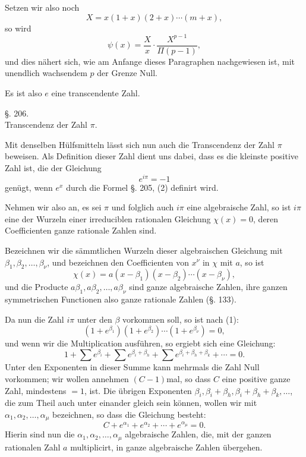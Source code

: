 \documentclass[11pt]{article}
\begin{document}
Setzen wir also noch
\[
X=x(1+x)(2+x)\cdots(m+x),
\]
so wird
\begin{equation}\tag{18}
\psi(x)=\frac{X}{x}\cdot\frac{X^{p-1}}{\Pi(p-1)},
\end{equation}
und dies nähert sich, wie am Anfange dieses Paragraphen nachgewiesen ist, mit unendlich wachsendem $p$ der Grenze Null.

Es ist also $e$ eine transcendente Zahl.

\begin{center}
{\large §. 206.}\\[0.4em]
{\large Transcendenz der Zahl $\pi$.}
\end{center}

Mit denselben Hülfsmitteln lässt sich nun auch die Transcendenz der Zahl $\pi$ beweisen. Als Definition dieser Zahl dient uns dabei, dass es die kleinste positive Zahl ist, die der Gleichung
\begin{equation}\tag{1}
e^{i\pi}=-1
\end{equation}
genügt, wenn $e^x$ durch die Formel §. 205, (2) definirt wird.

Nehmen wir also an, es sei $\pi$ und folglich auch $i\pi$ eine algebraische Zahl, so ist $i\pi$ eine der Wurzeln einer irreduciblen rationalen Gleichung $\chi(x)=0$, deren Coefficienten ganze rationale Zahlen sind.

Bezeichnen wir die sämmtlichen Wurzeln dieser algebraischen Gleichung mit $\beta_1,\beta_2,\ldots,\beta_\nu$, und bezeichnen den Coefficienten von $x^\nu$ in $\chi$ mit $a$, so ist
\begin{equation}\tag{2}
\chi(x)=a(x-\beta_1)(x-\beta_2)\cdots(x-\beta_\nu),
\end{equation}
und die Producte $a\beta_1,a\beta_2,\ldots,a\beta_\nu$ sind ganze algebraische Zahlen, ihre ganzen symmetrischen Functionen also ganze rationale Zahlen (§. 133).

Da nun die Zahl $i\pi$ unter den $\beta$ vorkommen soll, so ist nach (1):
\[
(1+e^{\beta_1})(1+e^{\beta_2})\cdots(1+e^{\beta_\nu})=0,
\]
und wenn wir die Multiplication ausführen, so ergiebt sich eine Gleichung:
\[
1+\sum e^{\beta_i}+\sum e^{\beta_i+\beta_h}
+\sum e^{\beta_i+\beta_h+\beta_k}+\cdots=0.
\]
Unter den Exponenten in dieser Summe kann mehrmals die Zahl Null vorkommen; wir wollen annehmen $(C-1)$mal, so dass $C$ eine positive ganze Zahl, mindestens $=1$, ist. Die übrigen Exponenten $\beta_i,\beta_i+\beta_h,\beta_i+\beta_h+\beta_k,\ldots$, die zum Theil auch unter einander gleich sein können, wollen wir mit $\alpha_1,\alpha_2,\ldots,\alpha_\mu$ bezeichnen, so dass die Gleichung besteht:
\begin{equation}\tag{3}
C+e^{\alpha_1}+e^{\alpha_2}+\cdots+e^{\alpha_\mu}=0.
\end{equation}
Hierin sind nun die $\alpha_1,\alpha_2,\ldots,\alpha_\mu$ algebraische Zahlen, die, mit der ganzen rationalen Zahl $a$ multiplicirt, in ganze algebraische Zahlen übergehen.
\end{document}
